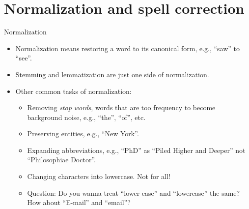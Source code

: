 \documentclass[11pt, handout]{beamer}
\begin{document}
\section{Normalization and spell correction}

\begin{frame}{Normalization} 
\begin{itemize}[<+->]
 \item Normalization means restoring a word to its canonical form, e.g., ``saw'' to ``see''. 
 \item Stemming and lemmatization are just one side of normalization. 
 \item Other common tasks of normalization:
 \begin{itemize}
  \item Removing \textit{stop words}, words that are too frequency to become background noise, e.g., ``the'', ``of'', etc. 
  \item Preserving entities, e.g., ``New York''. 
  \item Expanding abbreviations, e.g., ``PhD'' as ``Piled Higher and Deeper'' not ``Philosophiae Doctor''. 
  \item Changing characters into lowercase. Not for all! 
  \item Question: Do you wanna treat ``lower case'' and ``lowercase'' the same? How about ``E-mail'' and ``email''? 
 \end{itemize}
\end{itemize}
\end{frame}
\end{document}
